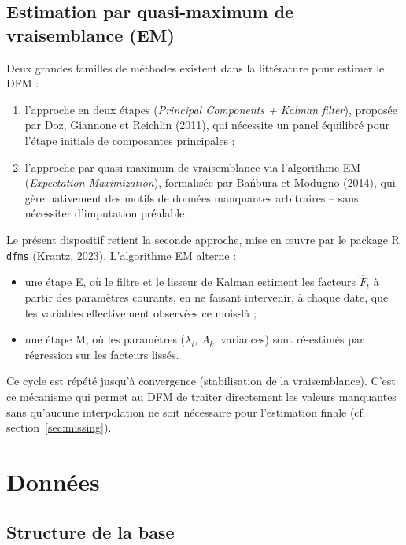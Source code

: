\documentclass[11pt,a4paper]{report}
\newcommand{\code}[1]{\texttt{#1}}
\begin{document}
\section{Estimation par quasi-maximum de vraisemblance (EM)}

Deux grandes familles de méthodes existent dans la littérature pour estimer le DFM :
\begin{enumerate}[nosep]
  \item l'approche en deux étapes (\emph{Principal Components + Kalman filter}), proposée par Doz, Giannone et Reichlin (2011), qui nécessite un panel équilibré pour l'étape initiale de composantes principales ;
  \item l'approche par quasi-maximum de vraisemblance via l'algorithme EM (\emph{Expectation-Maximization}), formalisée par Bańbura et Modugno (2014), qui gère nativement des motifs de données manquantes arbitraires -- sans nécessiter d'imputation préalable.
\end{enumerate}

Le présent dispositif retient la seconde approche, mise en \oe uvre par le package R \code{dfms} (Krantz, 2023). L'algorithme EM alterne :
\begin{itemize}[nosep]
  \item une étape E, où le filtre et le lisseur de Kalman estiment les facteurs $\hat{F}_t$ à partir des paramètres courants, en ne faisant intervenir, à chaque date, que les variables effectivement observées ce mois-là ;
  \item une étape M, où les paramètres ($\lambda_i$, $A_k$, variances) sont ré-estimés par régression sur les facteurs lissés.
\end{itemize}
Ce cycle est répété jusqu'à convergence (stabilisation de la vraisemblance). C'est ce mécanisme qui permet au DFM de traiter directement les valeurs manquantes sans qu'aucune interpolation ne soit nécessaire pour l'estimation finale (cf. section~\ref{sec:missing}).


\chapter{Données}

\section{Structure de la base}
\end{document}

